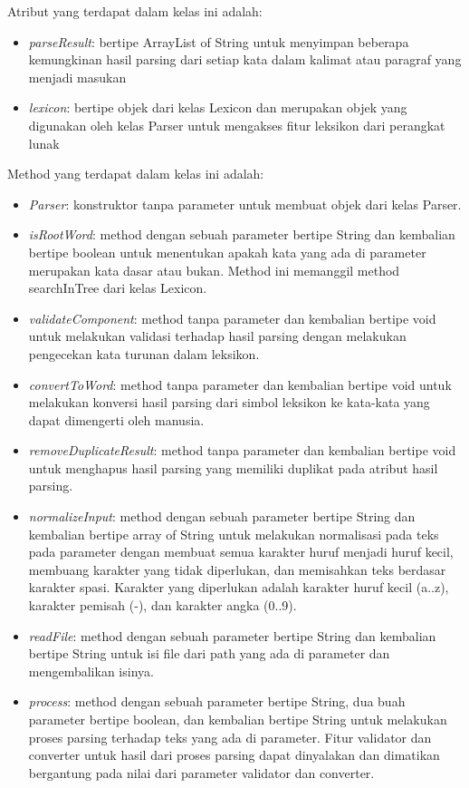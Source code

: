 Atribut yang terdapat dalam kelas ini adalah:

\begin{itemize}
	\item \textit{parseResult}: bertipe ArrayList of String untuk menyimpan beberapa kemungkinan hasil parsing dari setiap kata dalam kalimat atau paragraf yang menjadi masukan
	\item \textit{lexicon}: bertipe objek dari kelas Lexicon dan merupakan objek yang digunakan oleh kelas Parser untuk mengakses fitur leksikon dari perangkat lunak
\end{itemize}

Method yang terdapat dalam kelas ini adalah:

\begin{itemize}
	\item \textit{Parser}: konstruktor tanpa parameter untuk membuat objek dari kelas Parser.
	\item \textit{isRootWord}: method dengan sebuah parameter bertipe String dan kembalian bertipe boolean untuk menentukan apakah kata yang ada di parameter merupakan kata dasar atau bukan. Method ini memanggil method searchInTree dari kelas Lexicon.
	\item \textit{validateComponent}: method tanpa parameter dan kembalian bertipe void untuk melakukan validasi terhadap hasil parsing dengan melakukan pengecekan kata turunan dalam leksikon.
	\item \textit{convertToWord}: method tanpa parameter dan kembalian bertipe void untuk melakukan konversi hasil parsing dari simbol leksikon ke kata-kata yang dapat dimengerti oleh manusia.
	\item \textit{removeDuplicateResult}: method tanpa parameter dan kembalian bertipe void untuk menghapus hasil parsing yang memiliki duplikat pada atribut hasil parsing.
	\item \textit{normalizeInput}: method dengan sebuah parameter bertipe String dan kembalian bertipe array of String untuk melakukan normalisasi pada teks pada parameter dengan membuat semua karakter huruf menjadi huruf kecil, membuang karakter yang tidak diperlukan, dan memisahkan teks berdasar karakter spasi. Karakter yang diperlukan adalah karakter huruf kecil (a..z), karakter pemisah (-), dan karakter angka (0..9).
	\item \textit{readFile}: method dengan sebuah parameter bertipe String dan kembalian bertipe String untuk isi file dari path yang ada di parameter dan mengembalikan isinya.
	\item \textit{process}: method dengan sebuah parameter bertipe String, dua buah parameter bertipe boolean, dan kembalian bertipe String untuk melakukan proses parsing terhadap teks yang ada di parameter. Fitur validator dan converter untuk hasil dari proses parsing dapat dinyalakan dan dimatikan bergantung pada nilai dari parameter validator dan converter. 

\end{itemize}

